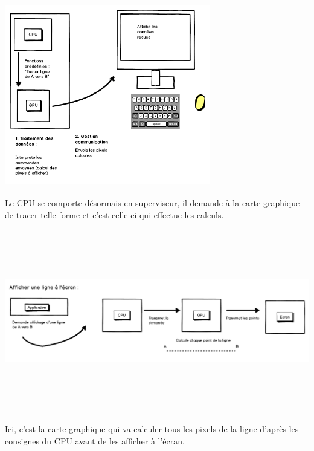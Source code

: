 \begin{center}
\includegraphics[width=9cm,height=8cm]{img/gpuRaster.png}

Le CPU se comporte désormais en superviseur, il demande à la carte graphique de tracer telle forme et c'est celle-ci qui effectue les calculs.


\includegraphics[width=16cm,height=8cm]{img/gpuRasterExemple.png}

Ici, c'est la carte graphique qui va calculer tous les pixels de la ligne d'après les consignes du CPU avant de les afficher à l'écran.

\end{center}
\newpage

